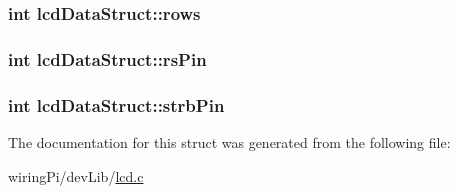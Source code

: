 \hypertarget{structlcdDataStruct_a204af6f15bf0744d00dd5009abf68f92}{
\subsubsection[{rows}]{\setlength{\rightskip}{0pt plus 5cm}int lcd\-Data\-Struct\-::rows}}\label{structlcdDataStruct_a204af6f15bf0744d00dd5009abf68f92}
\hypertarget{structlcdDataStruct_a7445e6beca769bef1b6f7bf1ce3e1894}{
\subsubsection[{rs\-Pin}]{\setlength{\rightskip}{0pt plus 5cm}int lcd\-Data\-Struct\-::rs\-Pin}}\label{structlcdDataStruct_a7445e6beca769bef1b6f7bf1ce3e1894}
\hypertarget{structlcdDataStruct_aec4a4388a2618850fa15603000a4a186}{
\subsubsection[{strb\-Pin}]{\setlength{\rightskip}{0pt plus 5cm}int lcd\-Data\-Struct\-::strb\-Pin}}\label{structlcdDataStruct_aec4a4388a2618850fa15603000a4a186}


The documentation for this struct was generated from the following file\-:\begin{DoxyCompactItemize}
\item 
wiring\-Pi/dev\-Lib/\hyperlink{devLib_2lcd_8c}{lcd.\-c}\end{DoxyCompactItemize}
